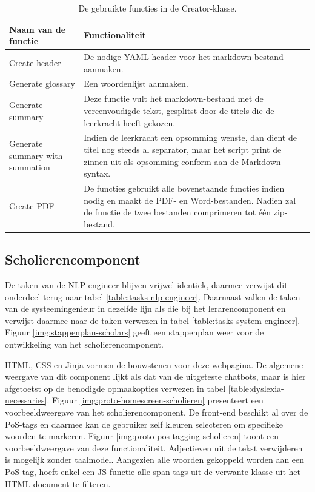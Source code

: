 \begin{table}[H]
	\begin{tabular}{ | m{5cm}| m{10cm} | }
		\hline
		Naam van de functie & Functionaliteit \\ \hline
		Create header & De nodige YAML-header voor het markdown-bestand aanmaken. \\ \hline
		Generate glossary & Een woordenlijst aanmaken. \\ \hline
		Generate summary & Deze functie vult het markdown-bestand met de vereenvoudigde tekst, gesplitst door de titels die de leerkracht heeft gekozen. \\ \hline
		Generate summary with summation & Indien de leerkracht een opsomming wenste, dan dient de titel nog steeds al separator, maar het script print de zinnen uit als opsomming conform aan de Markdown-syntax. \\ \hline
		Create PDF & De functies gebruikt alle bovenstaande functies indien nodig en maakt de PDF- en Word-bestanden. Nadien zal de functie de twee bestanden comprimeren tot één zip-bestand. \\ \hline
	\end{tabular}
	\caption{De gebruikte functies in de Creator-klasse.}
	\label{table:functions-creator-class}
\end{table}

\subsection{Scholierencomponent}

De taken van de NLP engineer blijven vrijwel identiek, daarmee verwijst dit onderdeel terug naar tabel \ref{table:tasks-nlp-engineer}. Daarnaast vallen de taken van de systeemingenieur in dezelfde lijn als die bij het lerarencomponent en verwijst daarmee naar de taken verwezen in tabel \ref{table:tasks-system-engineer}. Figuur \ref{img:stappenplan-scholars} geeft een stappenplan weer voor de ontwikkeling van het scholierencomponent.

\medspace

HTML, CSS en Jinja vormen de bouwstenen voor deze webpagina. De algemene weergave van dit component lijkt als dat van de uitgeteste chatbots, maar is hier afgetoetst op de benodigde opmaakopties verwezen in tabel \ref{table:dyslexia-necessaries}. Figuur \ref{img:proto-homescreen-scholieren} presenteert een voorbeeldweergave van het scholierencomponent. De front-end beschikt al over de PoS-tags en daarmee kan de gebruiker zelf kleuren selecteren om specifieke woorden te markeren. Figuur \ref{img:proto-pos-tagging-scholieren} toont een voorbeeldweergave van deze functionaliteit. Adjectieven uit de tekst verwijderen is mogelijk zonder taalmodel. Aangezien alle woorden gekoppeld worden aan een PoS-tag, hoeft enkel een JS-functie alle span-tags uit de verwante klasse uit het HTML-document te filteren.

